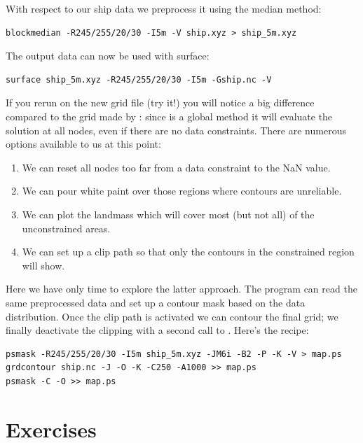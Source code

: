 \documentclass{report}
\begin{document}
With respect to our ship data we preprocess it using the median method:

{\small\begin{verbatim}
blockmedian -R245/255/20/30 -I5m -V ship.xyz > ship_5m.xyz
\end{verbatim}
}

The output data can now be used with surface:

{\small\begin{verbatim}
surface ship_5m.xyz -R245/255/20/30 -I5m -Gship.nc -V
\end{verbatim}
}

If you rerun  on the new grid file (try it!)
you will notice a big difference compared to the grid made by
: since  is a global method
it will evaluate the solution at all nodes, even if there are no
data constraints.  There are numerous options available to us at
this point:

\begin{enumerate}

\item We can reset all nodes too far from a data constraint to the
NaN value.

\item We can pour white paint over those regions where contours
are unreliable.

\item We can plot the landmass which will cover most (but not all)
of the unconstrained areas.

\item We can set up a clip path so that only the contours in the
constrained region will show.

\end{enumerate}

Here we have only time to explore the latter approach.  The 
program can read the same preprocessed data and set up a contour mask
based on the data distribution.  Once the clip path is activated we can
contour the final grid; we finally deactivate the clipping with a second
call to .  Here's the recipe:

{\small\begin{verbatim}
psmask -R245/255/20/30 -I5m ship_5m.xyz -JM6i -B2 -P -K -V > map.ps
grdcontour ship.nc -J -O -K -C250 -A1000 >> map.ps
psmask -C -O >> map.ps
\end{verbatim}
}

\section{Exercises}
\end{document}
